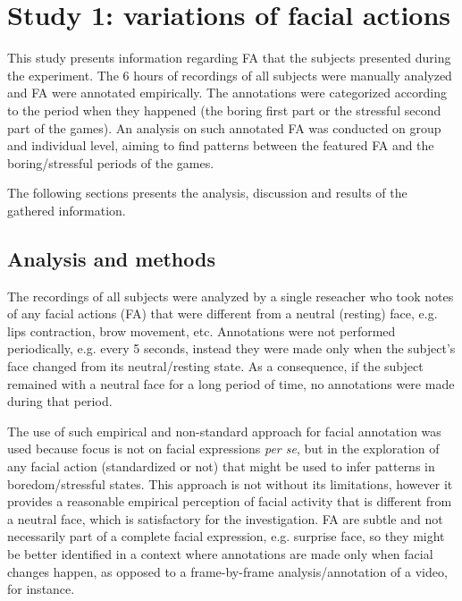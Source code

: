 \section{Study 1: variations of facial actions}
\label{sec:experiment1-study1}

This study presents information regarding FA that the subjects presented during the experiment. The 6 hours of recordings of all subjects were manually analyzed and FA were annotated empirically. The annotations were categorized according to the period when they happened (the boring first part or the stressful second part of the games). An analysis on such annotated FA was conducted on group and individual level, aiming to find patterns between the featured FA and the boring/stressful periods of the games.

The following sections presents the analysis, discussion and results of the gathered information.

\subsection{Analysis and methods}
\label{s:experiment1-study1-methodology}

The recordings of all subjects were analyzed by a single reseacher who took notes of any facial actions (FA) that were different from a neutral (resting) face, e.g. lips contraction, brow movement, etc. Annotations were not performed periodically, e.g. every 5 seconds, instead they were made only when the subject's face changed from its neutral/resting state. As a consequence, if the subject remained with a neutral face for a long period of time, no annotations were made during that period.

The use of such empirical and non-standard approach for facial annotation was used because focus is not on facial expressions \textit{per se}, but in the exploration of any facial action (standardized or not) that might be used to infer patterns in boredom/stressful states. This approach is not without its limitations, however it provides a reasonable empirical perception of facial activity that is different from a neutral face, which is satisfactory for the investigation. FA are subtle and not necessarily part of a complete facial expression, e.g. surprise face, so they might be better identified in a context where annotations are made only when facial changes happen, as opposed to a frame-by-frame analysis/annotation of a video, for instance.

